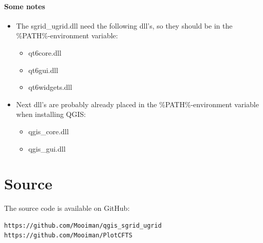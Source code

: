 \documentclass{Mooiman_memo}
\newcommand{\sugrid}{sgrid\_ugrid\xspace}
\begin{document}
\paragraph*{Some notes}
\phantom{mooiman}\vspace{-\baselineskip}
\begin{itemize}
\item The \sugrid.dll need the following dll's, so they should be in the \%PATH\%-environment variable:
\begin{itemize}
    \item qt6core.dll
    \item qt6gui.dll
    \item qt6widgets.dll
\end{itemize}

\item Next dll's are probably already placed in the \%PATH\%-environment variable when installing QGIS:
\begin{itemize}
    \item qgis\_core.dll
    \item qgis\_gui.dll
\end{itemize}
\end{itemize}
\section{Source}
The source code is available on GitHub:
\begin{Verbatim}
https://github.com/Mooiman/qgis_sgrid_ugrid
https://github.com/Mooiman/PlotCFTS
\end{Verbatim}
\end{document}
